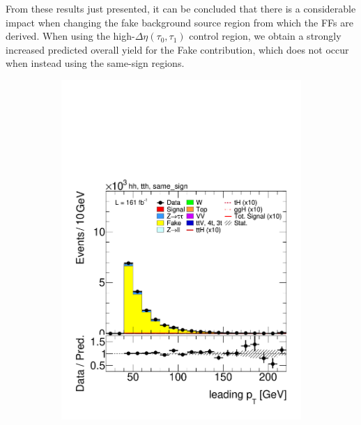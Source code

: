 From these results just presented, it can be concluded that there is a considerable impact when changing the fake background source region from which the FFs are derived. When using the high-$\Delta\eta(\tau_0,\tau_1)$ control region, we obtain a strongly increased predicted overall yield for the Fake contribution, which does not occur when instead using the same-sign regions.
\begin{figure}[htbp]
  \centering
  \begin{subfigure}[b]{0.45\textwidth}
    \centering
    \includegraphics[width=\textwidth]{images/same_sign_same_sign_run3/plot_tau_0_pt_hh_tth_22_23_24_same_sign.pdf}
    \caption{}
  \end{subfigure}
  \hfill
  \begin{subfigure}[b]{0.45\textwidth}
    \centering

\end{subfigure}
\end{figure}
